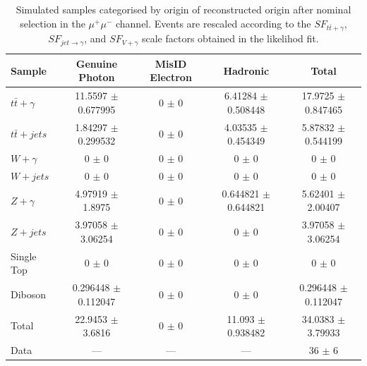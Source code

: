 \begin{table}
\begin{center}
\resizebox{\columnwidth}{!} {
\begin{tabular}{l|ccc|c}
\hline
	\textbf{Sample} & \textbf{Genuine Photon} & \textbf{MisID Electron} & \textbf{Hadronic} & \textbf{Total} \\
\hline
$t\bar{t}+\gamma$  & 11.5597 $\pm$ 0.677995 & 0 $\pm$ 0 & 6.41284 $\pm$ 0.508448 & 17.9725 $\pm$ 0.847465 \\
$t\bar{t}+jets$  & 1.84297 $\pm$ 0.299532 & 0 $\pm$ 0 & 4.03535 $\pm$ 0.454349 & 5.87832 $\pm$ 0.544199 \\
$W+\gamma$  & 0 $\pm$ 0 & 0 $\pm$ 0 & 0 $\pm$ 0 & 0 $\pm$ 0 \\
$W+jets$  & 0 $\pm$ 0 & 0 $\pm$ 0 & 0 $\pm$ 0 & 0 $\pm$ 0 \\
$Z+\gamma$  & 4.97919 $\pm$ 1.8975 & 0 $\pm$ 0 & 0.644821 $\pm$ 0.644821 & 5.62401 $\pm$ 2.00407 \\
$Z+jets$  & 3.97058 $\pm$ 3.06254 & 0 $\pm$ 0 & 0 $\pm$ 0 & 3.97058 $\pm$ 3.06254 \\
Single Top  & 0 $\pm$ 0 & 0 $\pm$ 0 & 0 $\pm$ 0 & 0 $\pm$ 0 \\
Diboson  & 0.296448 $\pm$ 0.112047 & 0 $\pm$ 0 & 0 $\pm$ 0 & 0.296448 $\pm$ 0.112047 \\
\hline
Total  & 22.9453 $\pm$ 3.6816 & 0 $\pm$ 0 & 11.093 $\pm$ 0.938482 & 34.0383 $\pm$ 3.79933 \\
Data  & --- & --- & --- & 36 $\pm$ 6 \\
\hline	
\end{tabular}
}
\end{center}
\caption{Simulated samples categorised by origin of reconstructed origin after nominal selection in the $\mu^+\mu^-$ channel. Events are rescaled according to the $SF_{t\bar{t}+\gamma}$, $SF_{jet\to\gamma}$, and $SF_{V+\gamma}$ scale factors obtained in the likelihod fit.}
\label{tab-SigPhotonsMuMuScaled}
\end{table}	

